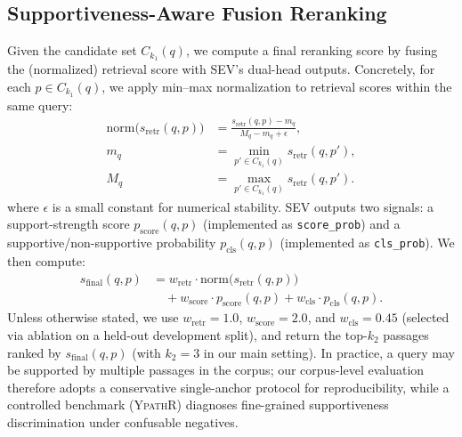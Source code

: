 \documentclass[preprint,12pt,a4paper]{elsarticle}
\begin{document}
\subsection{Supportiveness-Aware Fusion Reranking}
\label{sec:method:fusion}
Given the candidate set $C_{k_1}(q)$, we compute a final reranking score by fusing the (normalized) retrieval score with SEV's dual-head outputs.
Concretely, for each $p \in C_{k_1}(q)$, we apply min--max normalization to retrieval scores within the same query:
\begin{equation}
\label{eq:retr_norm}
\begin{aligned}
\mathrm{norm}\big(s_{\text{retr}}(q,p)\big)
&=
\frac{s_{\text{retr}}(q,p)-m_q}
{M_q-m_q+\epsilon}, \\
m_q &= \min_{p'\in C_{k_1}(q)} s_{\text{retr}}(q,p'), \\
M_q &= \max_{p'\in C_{k_1}(q)} s_{\text{retr}}(q,p').
\end{aligned}
\end{equation}
where $\epsilon$ is a small constant for numerical stability.
SEV outputs two signals: a support-strength score $p_{\text{score}}(q,p)$ (implemented as \texttt{score\_prob}) and a supportive/non-supportive probability $p_{\text{cls}}(q,p)$ (implemented as \texttt{cls\_prob}).
We then compute:
\begin{equation}
\label{eq:fusion_final}
\begin{aligned}
s_{\text{final}}(q,p)
&=
w_{\text{retr}}\cdot \mathrm{norm}\big(s_{\text{retr}}(q,p)\big) \\
&\quad + w_{\text{score}}\cdot p_{\text{score}}(q,p)
      + w_{\text{cls}}\cdot p_{\text{cls}}(q,p).
\end{aligned}
\end{equation}
Unless otherwise stated, we use $w_{\text{retr}}{=}1.0$, $w_{\text{score}}{=}2.0$, and $w_{\text{cls}}{=}0.45$ (selected via ablation on a held-out development split), and return the top-$k_2$ passages ranked by $s_{\text{final}}(q,p)$ (with $k_2{=}3$ in our main setting).
In practice, a query may be supported by multiple passages in the corpus; our corpus-level evaluation therefore adopts a conservative single-anchor protocol for reproducibility, while a controlled benchmark (\textsc{YpathR}) diagnoses fine-grained supportiveness discrimination under confusable negatives.
\end{document}
